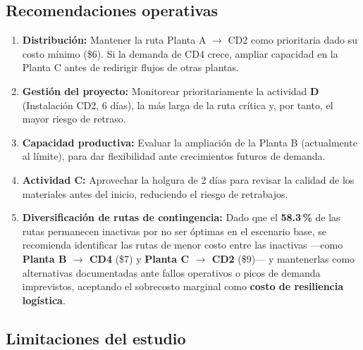 \documentclass[12pt,a4paper]{article}
\begin{document}
\subsection{Recomendaciones operativas}

\begin{enumerate}
  \item \textbf{Distribuci\'{o}n:} Mantener la ruta Planta A $\to$ CD2 como prioritaria
  dado su costo m\'{i}nimo (\$6). Si la demanda de CD4 crece, ampliar 
  capacidad en la Planta C antes de redirigir flujos de otras plantas.

  \item \textbf{Gesti\'{o}n del proyecto:} Monitorear prioritariamente la actividad
  \textbf{D} (Instalaci\'{o}n CD2, 6 d\'{i}as), la m\'{a}s larga de la ruta cr\'{i}tica y,
  por tanto, el mayor riesgo de retraso.

  \item \textbf{Capacidad productiva:} Evaluar la ampliaci\'{o}n de la Planta B
  (actualmente al l\'{i}mite), para dar flexibilidad ante crecimientos futuros de demanda.

  \item \textbf{Actividad C:} Aprovechar la holgura de 2 d\'{i}as para revisar la
  calidad de los materiales antes del inicio, reduciendo el riesgo de retrabajos.

  \item \noindent\textbf{Diversificaci\'{o}n de rutas de contingencia:} Dado que el 
  \textbf{58.3\,\%} de las rutas permanecen inactivas por no ser \'{o}ptimas en el 
  escenario base, se recomienda identificar las rutas de menor costo entre las inactivas 
  ---como \textbf{Planta B $\to$ CD4} (\$7) y \textbf{Planta C $\to$ CD2} (\$9)--- y 
  mantenerlas como alternativas documentadas ante fallos operativos o picos de demanda 
  imprevistos, aceptando el sobrecosto marginal como \textbf{costo de resiliencia 
  log\'{i}stica}.
\end{enumerate}

\subsection{Limitaciones del estudio}
\end{document}
